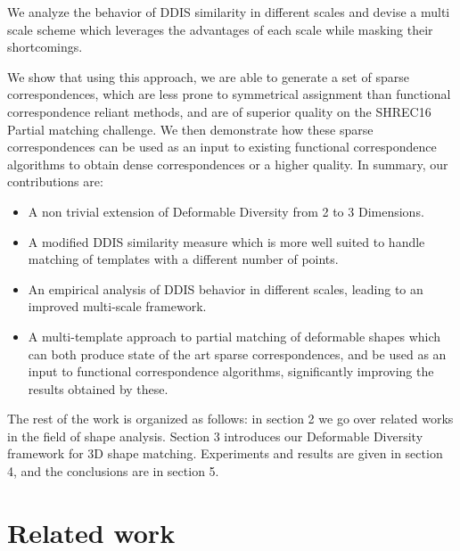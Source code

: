 \documentclass[10pt,twocolumn,letterpaper]{article}
\begin{document}
We analyze the behavior of DDIS similarity in different scales and devise a multi scale scheme which leverages the advantages of each scale while masking their shortcomings.

We show that using this approach, we are able to generate a set of sparse correspondences, which are less prone to symmetrical assignment than functional correspondence reliant methods, and are of superior quality on the SHREC16 Partial matching challenge\cite{cosmo2016shrec}. We then demonstrate how these sparse correspondences can be used as an input to existing functional correspondence algorithms to obtain dense correspondences or a higher quality.
In summary, our contributions are:
\begin{itemize}
	\item A non trivial extension of Deformable Diversity from 2 to 3 Dimensions.
	\item A modified DDIS similarity measure which is more well suited to handle matching of templates with a different number of points.
	\item An empirical analysis of DDIS behavior in different scales, leading to an improved multi-scale framework.
	\item A multi-template approach to partial matching of deformable shapes which can both produce state of the art sparse correspondences, and be used as an input to functional correspondence algorithms, significantly improving the results obtained by these.
\end{itemize}

The rest of the work is organized as follows: in section 2 we go over related works in the field of shape analysis. Section 3 introduces our Deformable Diversity framework for 3D shape matching. Experiments and results are given in section 4, and the conclusions are in section 5.


\section{Related work}
\label{chap:related work}
\end{document}
